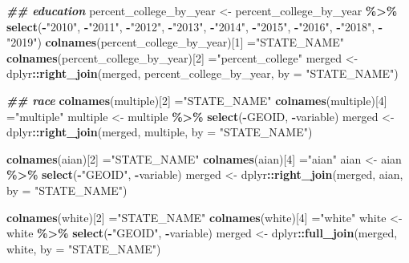 \documentclass[
]{article}
\newenvironment{Shaded}{\begin{snugshade}}{\end{snugshade}}
\newcommand{\AttributeTok}[1]{\textcolor[rgb]{0.13,0.29,0.53}{#1}}
\newcommand{\DecValTok}[1]{\textcolor[rgb]{0.00,0.00,0.81}{#1}}
\newcommand{\DocumentationTok}[1]{\textcolor[rgb]{0.56,0.35,0.01}{\textbf{\textit{#1}}}}
\newcommand{\FunctionTok}[1]{\textcolor[rgb]{0.13,0.29,0.53}{\textbf{#1}}}
\newcommand{\NormalTok}[1]{#1}
\newcommand{\OtherTok}[1]{\textcolor[rgb]{0.56,0.35,0.01}{#1}}
\newcommand{\SpecialCharTok}[1]{\textcolor[rgb]{0.81,0.36,0.00}{\textbf{#1}}}
\newcommand{\StringTok}[1]{\textcolor[rgb]{0.31,0.60,0.02}{#1}}
\begin{document}
\begin{Shaded}
\begin{Highlighting}[]
\DocumentationTok{\#\# education}
\NormalTok{percent\_college\_by\_year }\OtherTok{\textless{}{-}}\NormalTok{ percent\_college\_by\_year }\SpecialCharTok{\%\textgreater{}\%} \FunctionTok{select}\NormalTok{(}\SpecialCharTok{{-}}\StringTok{"2010"}\NormalTok{, }\SpecialCharTok{{-}}\StringTok{"2011"}\NormalTok{, }\SpecialCharTok{{-}}\StringTok{"2012"}\NormalTok{, }\SpecialCharTok{{-}}\StringTok{"2013"}\NormalTok{, }\SpecialCharTok{{-}}\StringTok{"2014"}\NormalTok{, }\SpecialCharTok{{-}}\StringTok{"2015"}\NormalTok{, }\SpecialCharTok{{-}}\StringTok{"2016"}\NormalTok{, }\SpecialCharTok{{-}}\StringTok{"2018"}\NormalTok{, }\SpecialCharTok{{-}}\StringTok{"2019"}\NormalTok{)}
\FunctionTok{colnames}\NormalTok{(percent\_college\_by\_year)[}\DecValTok{1}\NormalTok{] }\OtherTok{=}\StringTok{"STATE\_NAME"}
\FunctionTok{colnames}\NormalTok{(percent\_college\_by\_year)[}\DecValTok{2}\NormalTok{] }\OtherTok{=}\StringTok{"percent\_college"}
\NormalTok{merged }\OtherTok{\textless{}{-}}\NormalTok{ dplyr}\SpecialCharTok{::}\FunctionTok{right\_join}\NormalTok{(merged, percent\_college\_by\_year, }\AttributeTok{by =} \StringTok{"STATE\_NAME"}\NormalTok{)}

\DocumentationTok{\#\# race}
\FunctionTok{colnames}\NormalTok{(multiple)[}\DecValTok{2}\NormalTok{] }\OtherTok{=}\StringTok{"STATE\_NAME"}
\FunctionTok{colnames}\NormalTok{(multiple)[}\DecValTok{4}\NormalTok{] }\OtherTok{=}\StringTok{"multiple"}
\NormalTok{multiple }\OtherTok{\textless{}{-}}\NormalTok{ multiple }\SpecialCharTok{\%\textgreater{}\%} \FunctionTok{select}\NormalTok{(}\SpecialCharTok{{-}}\NormalTok{GEOID, }\SpecialCharTok{{-}}\NormalTok{variable)}
\NormalTok{merged }\OtherTok{\textless{}{-}}\NormalTok{ dplyr}\SpecialCharTok{::}\FunctionTok{right\_join}\NormalTok{(merged, multiple, }\AttributeTok{by =} \StringTok{"STATE\_NAME"}\NormalTok{)}

\FunctionTok{colnames}\NormalTok{(aian)[}\DecValTok{2}\NormalTok{] }\OtherTok{=}\StringTok{"STATE\_NAME"}
\FunctionTok{colnames}\NormalTok{(aian)[}\DecValTok{4}\NormalTok{] }\OtherTok{=}\StringTok{"aian"}
\NormalTok{aian }\OtherTok{\textless{}{-}}\NormalTok{ aian }\SpecialCharTok{\%\textgreater{}\%} \FunctionTok{select}\NormalTok{(}\SpecialCharTok{{-}}\StringTok{"GEOID"}\NormalTok{, }\SpecialCharTok{{-}}\NormalTok{variable)}
\NormalTok{merged }\OtherTok{\textless{}{-}}\NormalTok{ dplyr}\SpecialCharTok{::}\FunctionTok{right\_join}\NormalTok{(merged, aian, }\AttributeTok{by =} \StringTok{"STATE\_NAME"}\NormalTok{)}

\FunctionTok{colnames}\NormalTok{(white)[}\DecValTok{2}\NormalTok{] }\OtherTok{=}\StringTok{"STATE\_NAME"}
\FunctionTok{colnames}\NormalTok{(white)[}\DecValTok{4}\NormalTok{] }\OtherTok{=}\StringTok{"white"}
\NormalTok{white }\OtherTok{\textless{}{-}}\NormalTok{ white }\SpecialCharTok{\%\textgreater{}\%} \FunctionTok{select}\NormalTok{(}\SpecialCharTok{{-}}\StringTok{"GEOID"}\NormalTok{, }\SpecialCharTok{{-}}\NormalTok{variable)}
\NormalTok{merged }\OtherTok{\textless{}{-}}\NormalTok{ dplyr}\SpecialCharTok{::}\FunctionTok{full\_join}\NormalTok{(merged, white, }\AttributeTok{by =} \StringTok{"STATE\_NAME"}\NormalTok{)}


\end{Highlighting}
\end{Shaded}
\end{document}

